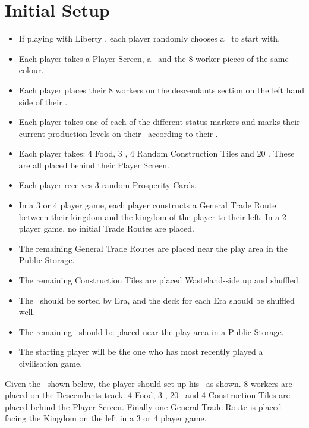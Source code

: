 \documentclass[10pt,twocolumn]{article}
\begin{document}
\section{Initial Setup}
\begin{itemize}
\item If playing with Liberty \baselands, each player randomly chooses a \baseland\ to start with.
\item Each player takes a Player Screen, a \psb\ and the 8 worker pieces of the same colour.
\item Each player places their 8 workers on the descendants section on the left hand side of their \psb.
\item Each player takes one of each of the \iftoggle{original-rules}{seven}{eight} different status markers and marks their current production levels on their \psb\ according to their \baseland.
\item Each player takes: 4 Food, 3 \money, 4 Random Construction Tiles and 20 \vps. These are all placed behind their Player Screen.
\item Each player receives 3 random Prosperity Cards.
\item In a 3 or 4 player game, each player constructs a General Trade Route between their kingdom and the kingdom of the player to their left. In a 2 player game, no initial Trade Routes are placed.
\item The remaining General Trade Routes are placed near the play area in the Public Storage.
\item The remaining Construction Tiles are placed Wasteland-side up and shuffled.
\item The \landcards\ should be sorted by Era, and the deck for each Era should be shuffled well.
\item The remaining \goods\ should be placed near the play area in a Public Storage.
\item The starting player will be the one who has most recently played a civilisation game.
\end{itemize}
\begin{BoxExample}Given the \baseland\ shown below, the player should set up his \psb\ as shown. 8 workers are placed on the Descendants track. 4 Food, 3 \money, 20 \vps\ and 4 Construction Tiles are placed behind the Player Screen. Finally one General Trade Route is placed facing the Kingdom on the left in a 3 or 4 player game.\end{BoxExample}
\end{document}
